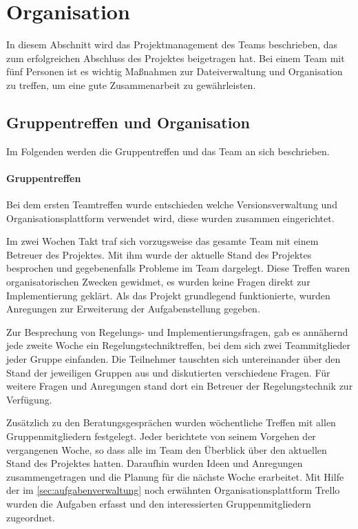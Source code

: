 \section{Organisation}
\label{cha:Organisation}
In diesem Abschnitt wird das Projektmanagement des Teams beschrieben, das zum erfolgreichen Abschluss des Projektes beigetragen hat. Bei einem Team mit fünf Personen ist es wichtig Maßnahmen zur Dateiverwaltung und Organisation zu treffen, um eine gute Zusammenarbeit zu gewährleisten.

\subsection{Gruppentreffen und Organisation}
\label{sec:gruppentreffenundorganisation}
Im Folgenden werden die Gruppentreffen und das Team an sich beschrieben.
\paragraph{Gruppentreffen}
Bei dem ersten Teamtreffen wurde entschieden welche Versionsverwaltung und Organisationsplattform verwendet wird, diese wurden zusammen eingerichtet.

Im zwei Wochen Takt traf sich vorzugsweise das gesamte Team mit einem Betreuer des Projektes. Mit ihm wurde der aktuelle Stand des Projektes besprochen und gegebenenfalls Probleme im Team dargelegt. Diese Treffen waren organisatorischen Zwecken gewidmet, es wurden keine Fragen direkt zur Implementierung geklärt. Als das Projekt grundlegend funktionierte, wurden Anregungen zur Erweiterung der Aufgabenstellung gegeben. 

Zur Besprechung von Regelungs- und Implementierungsfragen, gab es annähernd jede zweite Woche ein Regelungstechniktreffen, bei dem sich zwei Teammitglieder jeder Gruppe einfanden. Die Teilnehmer tauschten sich untereinander über den Stand der jeweiligen Gruppen aus und diskutierten verschiedene Fragen. Für weitere Fragen und Anregungen stand dort ein Betreuer der Regelungstechnik zur Verfügung.

Zusätzlich zu den Beratungsgesprächen wurden wöchentliche Treffen mit allen Gruppenmitgliedern festgelegt. Jeder berichtete von seinem Vorgehen der vergangenen Woche, so dass alle im Team den Überblick über den aktuellen Stand des Projektes hatten. Daraufhin wurden Ideen und Anregungen zusammengetragen und die Planung für die nächste Woche erarbeitet. Mit Hilfe der im \autoref{sec:aufgabenverwaltung} noch erwähnten Organisationsplattform Trello wurden die Aufgaben erfasst und den interessierten Gruppenmitgliedern zugeordnet. 


